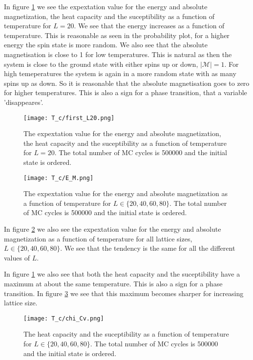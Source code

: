 \documentclass[11pt,a4wide]{article}
\begin{document}
In figure \ref{fig:  T_C_20E_M} we see the expextation value for the energy and absolute magnetization, the heat capacity and the suceptibility as a function of temperature for $L=20$. We see that the energy increases as a function of temperature. This is reasonable as seen in the probability plot, for a higher energy the spin state is more random. We also see that the absolute magnetisation is close to 1 for low temperatures. This is natural as then the system is close to the ground state with either spins up or down, $|\mathcal{M}|=1$. For high temeperatures the system is again in a more random state with as many spins up as down. So it is reasonable that the absolute magnetisation goes to zero for higher temperatures. This is also a sign for a phase transition, that a variable 'disappeares'. 

\begin{figure}[htp]
\texttt{[image: T\_c/first\_L20.png]}
\caption{The expextation value for the energy and absolute magnetization, the heat capacity and the suceptibility as a function of temperature for $L=20$. The total number of MC cycles is 500000 and the initial state is ordered. }
\centering
\label{fig:  T_C_20E_M}
\end{figure}

\begin{figure}[htp]
\texttt{[image: T\_c/E\_M.png]}
\caption{The expextation value for the energy and absolute magnetization as a function of temperature for $L\in \{20, 40, 60, 80\}$. The total number of MC cycles is 500000 and the initial state is ordered. }
\centering
\label{fig:  T_C_E_M}
\end{figure}

In figure \ref{fig:  T_C_E_M} we also see the expextation value for the energy and absolute magnetization as a function of temperature for all lattice sizes, $L\in \{20, 40, 60, 80\}$. We see that the tendency is the same for all the different values of $L$. 

In figure \ref{fig:  T_C_20E_M} we also see that both the heat capacity and the suceptibility have a maximum at about the same temperature. This is also a sign for a phase transition. In figure \ref{fig:  T_C_rest} we see that this maximum becomes sharper for increasing lattice size. 

\begin{figure}[htp]
\texttt{[image: T\_c/chi\_Cv.png]}
\caption{The heat capacity and the suceptibility as a function of temperature for $L\in \{20, 40, 60, 80\}$. The total number of MC cycles is 500000 and the initial state is ordered.}
\centering
\label{fig:  T_C_rest}
\end{figure}
\end{document}
